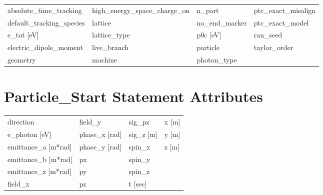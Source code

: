  \begin{tabular}{llll} \toprule
absolute_time_tracking           & high_energy_space_charge_on      & n_part                           & ptc_exact_misalign               \\
default_tracking_species         & lattice                          & no_end_marker                    & ptc_exact_model                  \\
e_tot [eV]                       & lattice_type                     & p0c [eV]                         & ran_seed                         \\
electric_dipole_moment           & live_branch                      & particle                         & taylor_order                     \\
geometry                         & machine                          & photon_type                      &                                  \\
 \bottomrule
 \end{tabular}
 \vfill
 
 \section{Particle_Start Statement Attributes}
 \label{s:list.particle.start}
 
 \begin{tabular}{llll} \toprule
direction                        & field_y                          & sig_pz                           & x [m]                            \\
e_photon [eV]                    & phase_x [rad]                    & sig_z [m]                        & y [m]                            \\
emittance_a [m*rad]              & phase_y [rad]                    & spin_x                           & z [m]                            \\
emittance_b [m*rad]              & px                               & spin_y                           &                                  \\
emittance_z [m*rad]              & py                               & spin_z                           &                                  \\
field_x                          & pz                               & t [sec]                          &                                  \\
 \bottomrule
 \end{tabular}
 \vfill
 
